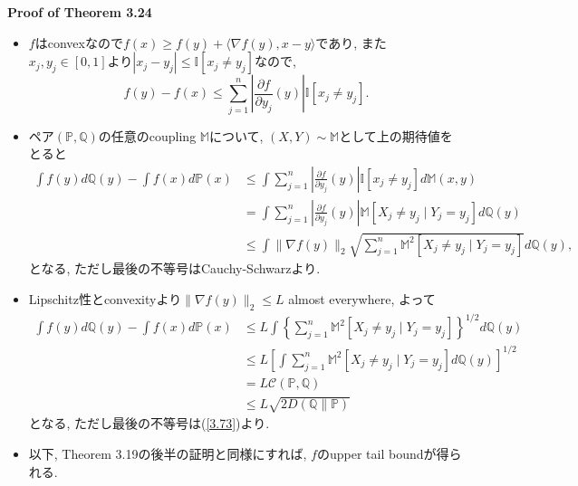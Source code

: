 \documentclass[aspectratio=169, dvipdfmx]{beamer}
\newcommand{\bb}{\mathbb}
\newcommand{\cc}{\mathcal}
\begin{document}
\begin{frame}{}{}
{\bf Proof of Theorem 3.24}
\begin{itemize}
    \item $f$はconvexなので$f(x) \ge f(y) + \langle \nabla f(y) , x-y \rangle$であり, また$x_j,y_j\in [0,1]$より$|x_j - y_j| \le \bb{I}[x_j \ne y_j]$なので,
            \[ f(y) - f(x) \le \sum_{j=1}^n \left|\frac{\partial f}{\partial y_j}(y)\right| \bb{I}[x_j \ne y_j]. \]
    \item ペア$(\bb{P}, \bb{Q})$の任意のcoupling $\bb{M}$について, $(X, Y) \sim \bb{M}$として上の期待値をとると
        \begin{align*}
            \int f(y) d \mathbb{Q}(y)-\int f(x) d \mathbb{P}(x)
            & \leq \int \sum_{j=1}^{n}\left|\frac{\partial f}{\partial y_{j}}(y)\right| \bb{I}\left[x_{j} \neq y_{j}\right] d \mathbb{M}(x, y) \\
            &=\int \sum_{j=1}^{n}\left|\frac{\partial f}{\partial y_{j}}(y)\right| \mathbb{M}\left[X_{j} \neq y_{j} \mid Y_{j}=y_{j}\right] d \mathbb{Q}(y) \\
            & \leq \int\|\nabla f(y)\|_{2} \sqrt{\sum_{j=1}^{n} \bb{M}^{2}\left[X_{j} \neq y_{j} \mid Y_{j}=y_{j}\right]} d \mathbb{Q}(y),
        \end{align*}
        となる, ただし最後の不等号はCauchy-Schwarzより.
\end{itemize}
\end{frame}

\begin{frame}
\begin{itemize}
    \item Lipschitz性とconvexityより$\|\nabla f(y)\|_2 \le L$ almost everywhere, よって
    \begin{align*}
        \int f(y) d \mathbb{Q}(y)-\int f(x) d \mathbb{P}(x) & \leq L \int\left\{\sum_{j=1}^{n} \bb{M}^{2}\left[X_{j} \neq y_{j} \mid Y_{j}=y_{j}\right]\right\}^{1 / 2} d \mathbb{Q}(y) \\
        & \leq L\left[\int \sum_{j=1}^{n} \bb{M}^{2}\left[X_{j} \neq y_{j} \mid Y_{j}=y_{j}\right] d \mathbb{Q}(y)\right]^{1 / 2} \\
        &=L \cc{C}(\mathbb{P}, \mathbb{Q})\\
        &\le L \sqrt{2 D(\bb{Q}\|\bb{P})}
    \end{align*}
    となる, ただし最後の不等号は(\ref{3.73})より.
    \item 以下, Theorem 3.19の後半の証明と同様にすれば, $f$のupper tail boundが得られる.
\end{itemize}
\end{frame}
\end{document}
